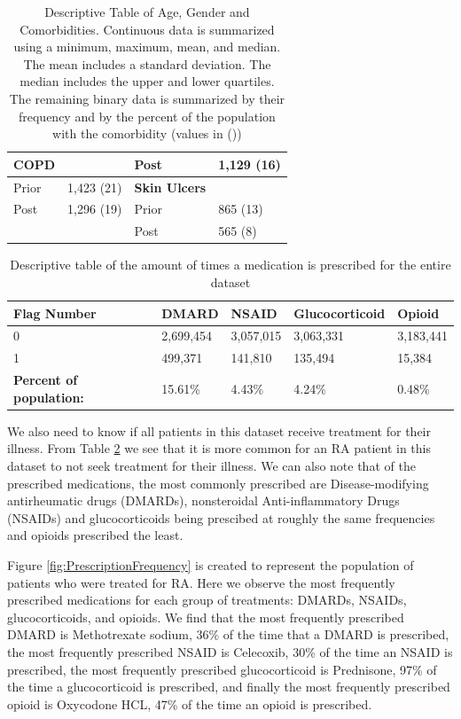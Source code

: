 \documentclass[10pt]{article}
\begin{document}
\begin{table}[H]
\begin{tabular}{l|l|l|l}
		\hline
		\bf{COPD} & ~ & Post & 1,129 (16)\\
		\hline
		Prior & 1,423 (21) & \bf{Skin Ulcers} & ~\\
		\hline
		Post & 1,296 (19) & Prior & 865 (13)\\
		\hline
		~ & ~ & Post & 565 (8) \\
		\hline
	\end{tabular}
	\caption{Descriptive Table of Age, Gender and Comorbidities. Continuous data is summarized using a minimum, maximum, mean, and median. The mean includes a standard deviation. The median includes the upper and lower quartiles. The remaining binary data is summarized by their frequency and by the percent of the population with the comorbidity (values in ())}
	\label{tab: age_gender_comorbid_full}
\end{table}

\begin{table}[H]
	\centering
	\begin{tabular}{l|l|l|l|l}
		\textbf{Flag Number} & \textbf{DMARD} & \textbf{NSAID} & \textbf{Glucocorticoid} & \textbf{Opioid} \\
		\hline
		0 & 2,699,454 & 3,057,015 & 3,063,331 & 3,183,441 \\
		\hline
		1 & 499,371 & 141,810 & 135,494 & 15,384 \\
		\hline
		\textbf{Percent of population:} & 15.61\% & 4.43\% & 4.24\% & 0.48\% \\
		\hline
	\end{tabular}
	\caption{Descriptive table of the amount of times a medication is prescribed for the entire dataset}
	\label{tab:prescription_rates}
\end{table}

We also need to know if all patients in this dataset receive treatment for their illness. From Table \ref{tab:prescription_rates} we see that it is more common for an RA patient in this dataset to not seek treatment for their illness. We can also note that of the prescribed medications, the most commonly prescribed are Disease-modifying antirheumatic drugs (DMARDs), nonsteroidal Anti-inflammatory Drugs (NSAIDs) and glucocorticoids being prescibed at roughly the same frequencies and opioids prescribed the least. 
 
Figure \ref{fig:PrescriptionFrequency} is created to represent the population of patients who were treated for RA. Here we observe the most frequently prescribed medications for each group of treatments: DMARDs, NSAIDs, glucocorticoids, and opioids. We find that the most frequently prescribed DMARD is Methotrexate sodium, 36\% of the time that a DMARD is prescribed, the most frequently prescribed NSAID is Celecoxib, 30\% of the time an NSAID is prescribed, the most frequently prescribed glucocorticoid is Prednisone, 97\% of the time a glucocorticoid is prescribed, and finally the most frequently prescribed opioid is Oxycodone HCL, 47\% of the time an opioid is prescribed.  
\end{document}
